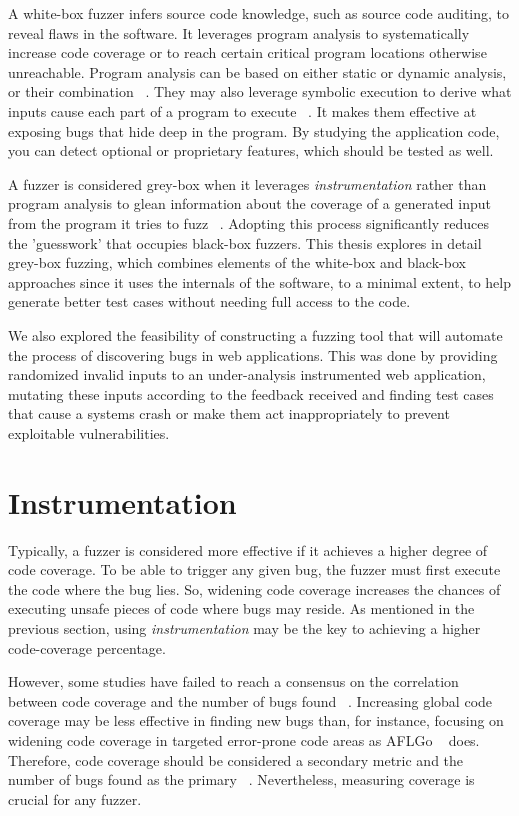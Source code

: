 A white-box fuzzer infers source code knowledge, such as source code auditing, to reveal
flaws in the software. It leverages program analysis to systematically
increase code coverage or to reach certain critical program locations otherwise unreachable. Program analysis can be based on either static or dynamic analysis, or their combination ~\cite{program_analysis_book}. They may also leverage symbolic execution to derive what inputs cause each part of a program to execute ~\cite{king1976symoblic}. It makes them effective at exposing bugs that hide deep in the program. By studying the application code, you can detect optional or proprietary features, which should be tested as well.

A fuzzer is considered grey-box when it leverages \emph{instrumentation} rather than program analysis to glean information about the coverage of a generated input from the program it tries to fuzz ~\cite{zalewski2015american,efs2007}. Adopting this process significantly reduces the 'guesswork' that occupies black-box fuzzers. This thesis explores in detail grey-box fuzzing, which combines elements of the white-box and black-box approaches since it uses the internals of the software, to a minimal extent, to help generate better test cases without needing full access to the code. 

We also explored the feasibility of constructing a fuzzing tool that will automate the process of discovering bugs in web applications. This was done by providing randomized invalid inputs to an under-analysis instrumented web application, mutating these inputs according to the feedback received and finding test cases that cause a systems crash or make them act inappropriately to prevent exploitable vulnerabilities.

\section{Instrumentation}
Typically, a fuzzer is considered more effective if it achieves a higher degree of code coverage. To be able to trigger any given bug, the fuzzer must first execute the code where the bug lies. So, widening code coverage increases the chances of executing unsafe pieces of code where bugs may reside. As mentioned in the previous section, using \emph{instrumentation} may be the key to achieving a higher code-coverage percentage. 

However, some studies have failed to reach a consensus on the correlation between code coverage and the number of bugs found ~\cite{klees2018Evaluation,coverage2014effectiveness}. 
Increasing global code coverage may be less effective in finding new bugs than, for instance, focusing on widening code coverage in targeted error-prone code areas as AFLGo ~\cite{bohme2017directed} does. Therefore, code coverage should be considered a secondary metric and the number of bugs found as the primary ~\cite{klees2018Evaluation}. Nevertheless, measuring coverage is crucial for any fuzzer.

